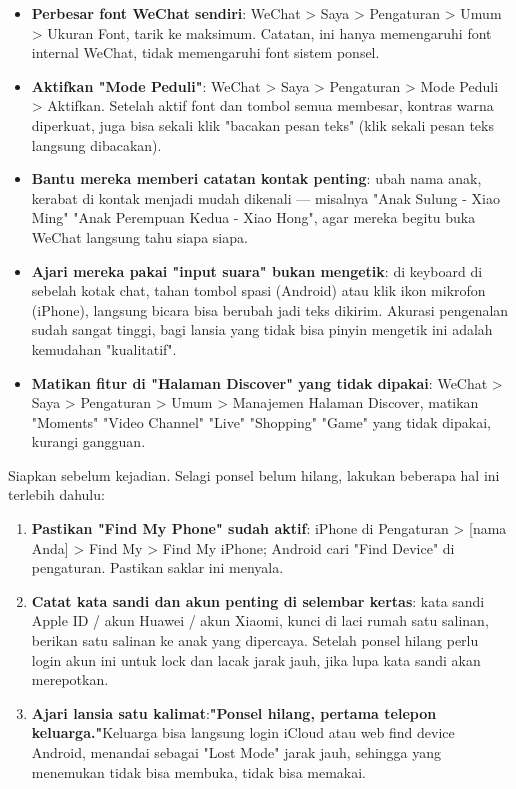 \begin{itemize}
  \item \textbf{Perbesar font WeChat sendiri}: WeChat > Saya > Pengaturan > Umum > Ukuran Font, tarik ke maksimum. Catatan, ini hanya memengaruhi font internal WeChat, tidak memengaruhi font sistem ponsel.
  \item \textbf{Aktifkan "Mode Peduli"}: WeChat > Saya > Pengaturan > Mode Peduli > Aktifkan. Setelah aktif font dan tombol semua membesar, kontras warna diperkuat, juga bisa sekali klik "bacakan pesan teks" (klik sekali pesan teks langsung dibacakan).
  \item \textbf{Bantu mereka memberi catatan kontak penting}: ubah nama anak, kerabat di kontak menjadi mudah dikenali — misalnya "Anak Sulung - Xiao Ming" "Anak Perempuan Kedua - Xiao Hong", agar mereka begitu buka WeChat langsung tahu siapa siapa.
  \item \textbf{Ajari mereka pakai "input suara" bukan mengetik}: di keyboard di sebelah kotak chat, tahan tombol spasi (Android) atau klik ikon mikrofon (iPhone), langsung bicara bisa berubah jadi teks dikirim. Akurasi pengenalan sudah sangat tinggi, bagi lansia yang tidak bisa pinyin mengetik ini adalah kemudahan "kualitatif".
  \item \textbf{Matikan fitur di "Halaman Discover" yang tidak dipakai}: WeChat > Saya > Pengaturan > Umum > Manajemen Halaman Discover, matikan "Moments" "Video Channel" "Live" "Shopping" "Game" yang tidak dipakai, kurangi gangguan.
\end{itemize}


Siapkan sebelum kejadian. Selagi ponsel belum hilang, lakukan beberapa hal ini terlebih dahulu:

\begin{enumerate}
  \item \textbf{Pastikan "Find My Phone" sudah aktif}: iPhone di Pengaturan > [nama Anda] > Find My > Find My iPhone; Android cari "Find Device" di pengaturan. Pastikan saklar ini menyala.
  \item \textbf{Catat kata sandi dan akun penting di selembar kertas}: kata sandi Apple ID / akun Huawei / akun Xiaomi, kunci di laci rumah satu salinan, berikan satu salinan ke anak yang dipercaya. Setelah ponsel hilang perlu login akun ini untuk lock dan lacak jarak jauh, jika lupa kata sandi akan merepotkan.
  \item \textbf{Ajari lansia satu kalimat}:\textbf{"Ponsel hilang, pertama telepon keluarga."}Keluarga bisa langsung login iCloud atau web find device Android, menandai sebagai "Lost Mode" jarak jauh, sehingga yang menemukan tidak bisa membuka, tidak bisa memakai.
\end{enumerate}

